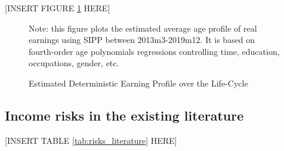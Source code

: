 \label{appendix:life-cycle-determinstic}

\begin{center}
[INSERT FIGURE \ref{fig:life-cycle-determinstic} HERE]  
\end{center}

 \begin{figure}[!ht]
    	\caption{Estimated Deterministic Earning Profile over the Life-Cycle}
    	\label{fig:life-cycle-determinstic}
    	\begin{center}
    	\end{center}
    	\begin{flushleft}Note:  this figure plots the estimated average age profile of real earnings using SIPP between 2013m3-2019m12. It is based on fourth-order age polynomials regressions controlling time, education, occupations, gender, etc.\end{flushleft}
    \end{figure}
    
    
\subsection{Income risks in the existing literature}

\begin{center}
[INSERT TABLE \ref{tab:risks_literature} HERE]  
\end{center}

